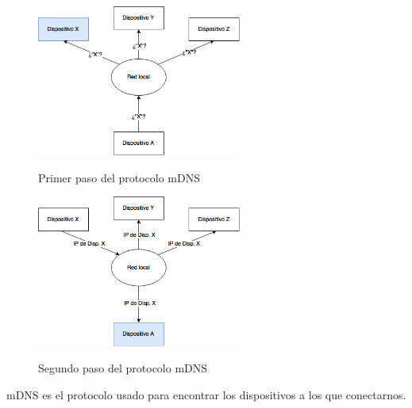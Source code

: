 \begin{figure}[h]
	\centering
	\includegraphics[width=0.6\textwidth]{./Imagenes/mdns1.png}
	\label{fig:mdns1}
	\caption{Primer paso del protocolo mDNS}
\end{figure}

\begin{figure}[h]
	\centering
	\includegraphics[width=0.6\textwidth]{./Imagenes/mdns2.png}
	\label{fig:mdns2}
	\caption{Segundo paso del protocolo mDNS}
\end{figure}

mDNS es el protocolo usado para encontrar los dispositivos a los que conectarnos.
